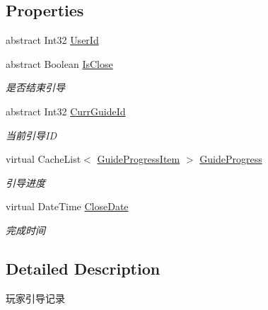 \subsection*{Properties}
\begin{DoxyCompactItemize}
\item 
abstract Int32 \mbox{\hyperlink{class_t_net_1_1_com_1_1_model_1_1_user_guide_a7294aa72b85e6d3817271322932a140b}{User\+Id}}
\item 
abstract Boolean \mbox{\hyperlink{class_t_net_1_1_com_1_1_model_1_1_user_guide_a72fdc4e2d9e4a35f8d0a3c9899a2b15d}{Is\+Close}}
\begin{DoxyCompactList}\small\item\em 是否结束引导 \end{DoxyCompactList}\item 
abstract Int32 \mbox{\hyperlink{class_t_net_1_1_com_1_1_model_1_1_user_guide_af2e6bf1096eaa24de95735a156af5922}{Curr\+Guide\+Id}}
\begin{DoxyCompactList}\small\item\em 当前引导\+ID \end{DoxyCompactList}\item 
virtual Cache\+List$<$ \mbox{\hyperlink{class_t_net_1_1_com_1_1_model_1_1_guide_progress_item}{Guide\+Progress\+Item}} $>$ \mbox{\hyperlink{class_t_net_1_1_com_1_1_model_1_1_user_guide_a7f24c31a9b3a51c60f336cc727b54138}{Guide\+Progress}}
\begin{DoxyCompactList}\small\item\em 引导进度 \end{DoxyCompactList}\item 
virtual Date\+Time \mbox{\hyperlink{class_t_net_1_1_com_1_1_model_1_1_user_guide_a0a12eb0022ee003245bff1efec6f6c27}{Close\+Date}}
\begin{DoxyCompactList}\small\item\em 完成时间 \end{DoxyCompactList}\end{DoxyCompactItemize}


\subsection{Detailed Description}
玩家引导记录 




